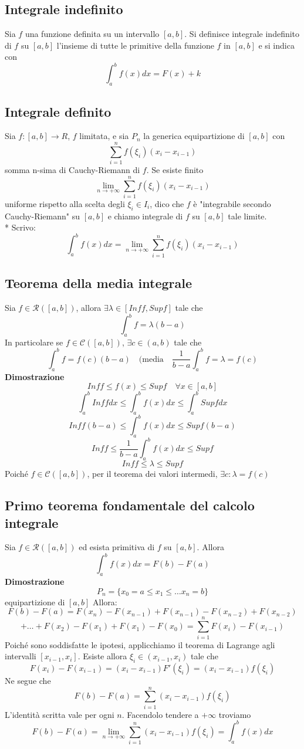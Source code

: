 \documentclass[12pt]{article}
\begin{document}
\subsection{Integrale indefinito}
Sia $f$ una funzione definita su un intervallo $[a,b]$. Si definisce integrale indefinito di $f$ su $[a,b]$ l'insieme di tutte le primitive della funzione $f$ in $[a,b]$ e si indica con 
\[\int_a^b f(x)dx = F(x) + k\]

\subsection{Integrale definito}
Sia $f:[a,b] \to R$, $f$ limitata, e sia $P_n$ la generica equipartizione di $[a,b]$ con 
\[ \sum_{i = 1}^{n}f(\xi_i)(x_i-x_{i-1})\]
somma n-sima di Cauchy-Riemann di $f$. Se esiste finito \[ \lim_{n \to +\infty} \sum_{i = 1}^{n}f(\xi_i)(x_i-x_{i-1})\]
uniforme rispetto alla scelta degli $\xi_i \in I_i$, dico che $f$ è "integrabile secondo Cauchy-Riemann" su $[a,b]$ e chiamo integrale di $f$ su $[a,b]$ tale limite.\\*
Scrivo: 
\[\displaystyle \int_{a}^{b} f(x)dx = \lim_{n \to +\infty} \sum_{i = 1}^{n}f(\xi_i)(x_i-x_{i-1})\]

\subsection{Teorema della media integrale}
Sia $f \in \mathscr{R}([a,b])$, allora $\exists \lambda \in [Inff, Supf]$ tale che 
\[
\int_{a}^{b}f = \lambda(b-a)\]
In particolare se $f \in \mathscr{C}([a,b])$, $\exists c \in (a,b)$ tale che
\[ \int_{a}^{b} f = f(c)(b-a) \quad ( \text{media} \quad \frac{1}{b-a}\int_{a}^{b} f = \lambda =f(c)\]
\newpage
\textbf{Dimostrazione}
\[Inff \leq f(x) \leq Supf \quad \forall x \in [a,b]\]
\[\int_{a}^{b} Inff dx \leq \int_{a}^{b} f(x) dx \leq \int_{a}^{b} Supf dx\]
\[Inff(b-a) \leq \int_{a}^{b} f(x) dx \leq Supf (b-a)\]
\[Inff \leq \frac{1}{b-a} \int_{a}^{b} f(x) dx \leq Supf\]
\[Inff \leq \lambda \leq Supf\]
Poiché $f \in \mathscr{C}([a,b])$, per il teorema dei valori intermedi, $\exists c: \lambda = f(c)$

\subsection{Primo teorema fondamentale del calcolo integrale}
Sia $f \in \mathscr{R} ([a,b])$ ed esista primitiva di $f$ su $[a,b]$. Allora 
\[\int_{a}^{b} f(x) dx = F(b) - F(a)\]
\textbf{Dimostrazione}
\[ P_n = \{ x_0 = a \leq x_1 \leq \dots x_n = b \} \] equipartizione di $[a,b]$ Allora:
\[ F(b) - F(a) = F(x_n) - F(x_{n-1}) + F(x_{n-1}) - F(x_{n-2}) + F(x_{n-2})\]
\[+ \dots + F(x_2) - F(x_1) + F(x_1) - F(x_0) = \sum_{i = 1}^{n} F(x_i) - F(x_{i-1})\]
Poiché sono soddisfatte le ipotesi, applicchiamo il teorema di Lagrange agli intervalli $[x_{i-1}, x_i]$. Esiste allora $\xi_i \in (x_{i-1}, x_i)$ tale che
\[ F(x_i) - F(x_{i-1}) = (x_i - x_{i-1})F'(\xi_i) = (x_i - x_{i-1})f(\xi_i)\]
Ne segue che
\[F(b) - F(a) = \sum_{i = 1}^{n} (x_i - x_{i-1})f(\xi_i) \]
L'identità scritta vale per ogni $n$. Facendolo tendere a $+\infty$ troviamo
\[\displaystyle F(b) - F(a) = \lim_{n \to +\infty} \sum_{i = 1}^{n} (x_i - x_{i-1})f(\xi_i) = \int_{a}^{b} f(x) dx\]
\end{document}
